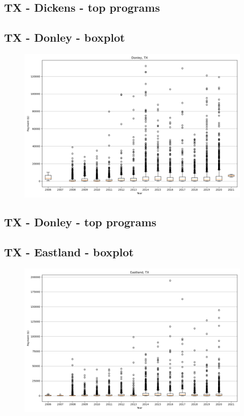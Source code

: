 \subsection*{TX - Dickens - top programs}

\newpage
\subsection*{TX - Donley - boxplot}
\begin{figure}[h]
\centering
\includegraphics[width=7in]{../output/boxplots/counties/Donley-TX_boxplot.png}
\end{figure}


\subsection*{TX - Donley - top programs}

\newpage
\subsection*{TX - Eastland - boxplot}
\begin{figure}[h]
\centering
\includegraphics[width=7in]{../output/boxplots/counties/Eastland-TX_boxplot.png}
\end{figure}


